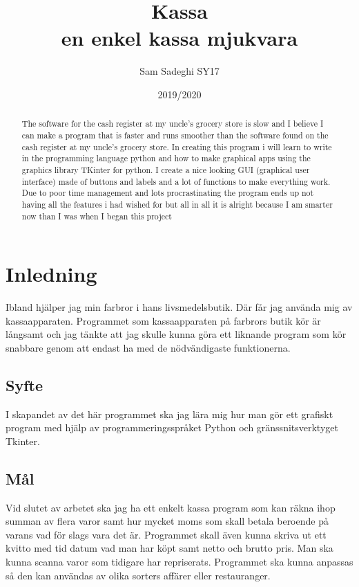 \documentclass[a4paper, 12pt]{article}
\title{Kassa\\\large en enkel kassa mjukvara}
\author{Sam Sadeghi SY17}
\date{2019/2020}
\begin{document}
\begin{titlepage}
\maketitle
\end{titlepage}


\begin{abstract}
The software for the cash register at my uncle's grocery store is slow and I believe I can make a program that is faster and runs smoother than the software found on the cash register at my uncle's grocery store.
 In creating this program i will learn to write in the programming language python and how to make graphical apps using the graphics library TKinter for python.
I create a nice looking GUI (graphical user interface) made of buttons and labels and a lot of functions to make everything work.
Due to poor time management and lots procrastinating the program ends up not having all the features i had wished for but all in all it is alright because I am smarter now than I was when I began this project
\end{abstract}
\newpage
\tableofcontents
\newpage

\section{Inledning}
Ibland hjälper jag min farbror i hans livsmedelsbutik. 
Där får jag  använda mig av kassaapparaten. 
Programmet som kassaapparaten på farbrors butik kör är långsamt och jag tänkte att jag skulle kunna göra ett liknande program som kör snabbare genom att endast ha med de nödvändigaste funktionerna.

\subsection{Syfte}

I skapandet av det här programmet ska jag lära mig hur man gör ett grafiskt program med hjälp av programmeringsspråket Python och gränssnitsverktyget Tkinter. 

\subsection{Mål}

Vid slutet av arbetet ska jag ha ett enkelt kassa program som kan räkna ihop summan av flera varor samt hur mycket moms som skall betala beroende på varans vad för slags vara det är.
 Programmet skall även kunna skriva ut ett kvitto med tid datum vad man har köpt samt netto och brutto pris.
 Man ska kunna scanna varor som tidigare har repriserats.
 Programmet ska kunna anpassas så den kan användas av olika sorters affärer eller restauranger.
\end{document}
